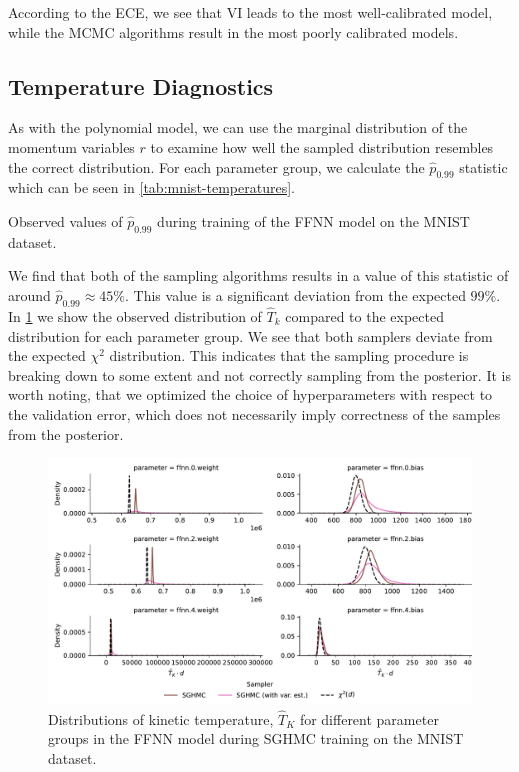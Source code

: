 According to the ECE, we see that VI leads to the most well-calibrated model, while the MCMC algorithms result in the most poorly calibrated models.

\subsection{Temperature Diagnostics}
As with the polynomial model, we can use the marginal distribution of the momentum variables $r$ to examine how well the sampled distribution resembles the correct distribution.
For each parameter group, we calculate the $\hat p_{0.99}$ statistic which can be seen in \cref{tab:mnist-temperatures}.
\begin{table}[htbp]
    \centering
    
    \caption{Observed values of $\hat{p}_{0.99}$ during training of the FFNN model on the MNIST dataset.}
    \label{tab:mnist-temperatures}
\end{table}
We find that both of the sampling algorithms results in a value of this statistic of around $\hat{p}_{0.99}\approx 45\%$.
This value is a significant deviation from the expected $99\%$.
In \cref{fig:mnist-temperatures} we show the observed distribution of $\hat{T}_k$ compared to the expected distribution for each parameter group. 
We see that both samplers deviate from the expected $\chi^2$ distribution.
This indicates that the sampling procedure is breaking down to some extent and not correctly sampling from the posterior.
It is worth noting, that we optimized the choice of hyperparameters with respect to the validation error, which does not necessarily imply correctness of the samples from the posterior. 
\begin{figure}[htbp]
    \centering
    \includegraphics[width=\linewidth]{Figures/mnist-temperatures.pdf}
    \caption{Distributions of kinetic temperature, $\hat{T}_K$ for different parameter groups in the FFNN model during SGHMC training on the MNIST dataset.}
    \label{fig:mnist-temperatures}
\end{figure}


